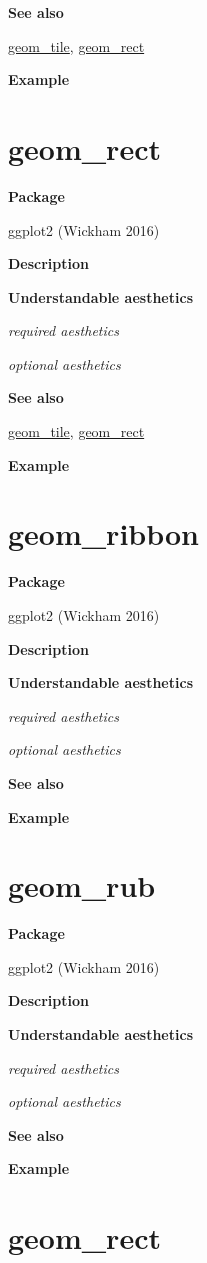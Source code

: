 \documentclass[
  letterpaper,
  DIV=11,
  numbers=noendperiod]{scrreprt}
\begin{document}
\textbf{See also}

\hyperref[tile]{geom\_tile}, \hyperref[rect]{geom\_rect}

\textbf{Example}

\section{geom\_rect}\label{geom_rect}

\textbf{Package}

ggplot2 (Wickham 2016)

\textbf{Description}

\textbf{Understandable aesthetics}

\emph{required aesthetics}

\emph{optional aesthetics}

\textbf{See also}

\hyperref[tile]{geom\_tile}, \hyperref[rect]{geom\_rect}

\textbf{Example}

\section{geom\_ribbon}\label{geom_ribbon}

\textbf{Package}

ggplot2 (Wickham 2016)

\textbf{Description}

\textbf{Understandable aesthetics}

\emph{required aesthetics}

\emph{optional aesthetics}

\textbf{See also}

\textbf{Example}

\section{geom\_rub}\label{geom_rub}

\textbf{Package}

ggplot2 (Wickham 2016)

\textbf{Description}

\textbf{Understandable aesthetics}

\emph{required aesthetics}

\emph{optional aesthetics}

\textbf{See also}

\textbf{Example}

\section{geom\_rect}\label{geom_rect-1}
\end{document}
